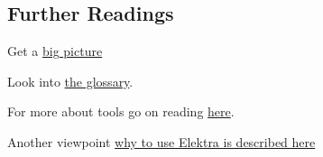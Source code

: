 \subsection*{Further Readings}


\begin{DoxyItemize}
\item Get a \hyperlink{doc_BIGPICTURE_md}{big picture}
\item Look into \hyperlink{md_doc_help_elektra-glossary_doc_help_elektra-glossary_md}{the glossary}.
\item For more about tools go on reading \hyperlink{md_doc_help_kdb_doc_help_kdb_md}{here}.
\item Another viewpoint \hyperlink{md_doc_help_elektra-introduction_doc_help_elektra-introduction_md}{why to use Elektra is described here} 
\end{DoxyItemize}
